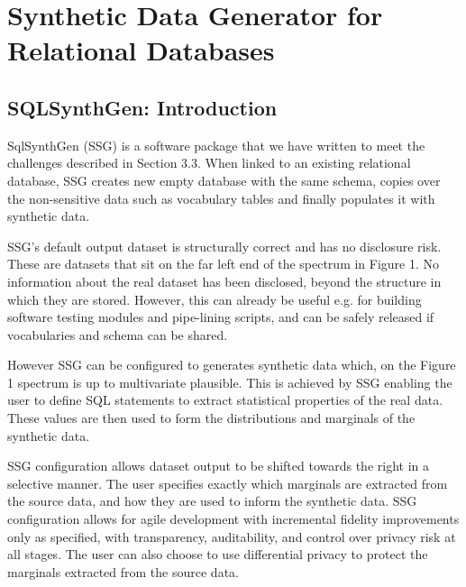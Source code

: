 \documentclass[11pt]{article}
\begin{document}
\section{Synthetic Data Generator for Relational Databases}

\subsection{SQLSynthGen: Introduction}


SqlSynthGen (SSG) is a software package that we have written to meet the challenges described in Section 3.3. When linked to an existing relational database, SSG creates new empty database with the same schema, copies over the non-sensitive data such as vocabulary tables and finally populates it with synthetic data. 

SSG's default output dataset is structurally correct and has no disclosure risk. These are datasets that sit on the far left end of the spectrum in Figure 1. No information about the real dataset has been disclosed, beyond the structure in which they are stored. However, this can already be useful e.g. for building software testing modules and pipe-lining scripts, and can be safely released if vocabularies and schema can be shared.

However SSG can be configured to generates synthetic data which, on the Figure 1 spectrum is up to multivariate plausible. This is achieved by SSG enabling the user to define SQL statements to extract statistical properties of the real data. These values are then used to form the distributions and marginals of the synthetic data. 

SSG configuration allows dataset output to be shifted towards the right in a selective manner. The user specifies exactly which marginals are extracted from the source data, and how they are used to inform the synthetic data. SSG configuration allows for agile development with incremental fidelity improvements only as specified, with transparency, auditability, and control over privacy risk at all stages. The user can also choose to use differential privacy to protect the marginals extracted from the source data.
\end{document}
